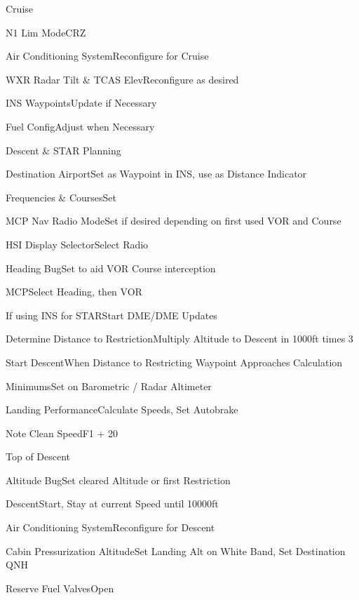 \documentclass[sim-use, blue_items]{checklist}
\begin{document}
\begin{checklist}{Cruise}
	 {
		\item{N1 Lim Mode}{CRZ}
		\item{Air Conditioning System}{Reconfigure for Cruise}
	\item{WXR Radar Tilt \& TCAS Elev}{Reconfigure as desired}
	}
	\item{INS Waypoints}{Update if Necessary}
	\item{Fuel Config}{Adjust when Necessary}
\end{checklist}

\begin{checklist}{Descent \& STAR Planning}
	\item{Destination Airport}{Set as Waypoint in INS, use as Distance Indicator}
	 {
		\item{Frequencies \& Courses}{Set}
		\item{MCP Nav Radio Mode}{Set if desired depending on first used VOR and Course}
		\item{HSI Display Selector}{Select Radio}
		\item{Heading Bug}{Set to aid VOR Course interception}
		\item{MCP}{Select Heading, then VOR}
	}
	\item{If using INS for STAR}{Start DME/DME Updates}
	 {
		\item{Determine Distance to Restriction}{Multiply Altitude to Descent in 1000ft times 3}
		\item{Start Descent}{When Distance to Restricting Waypoint Approaches Calculation}
	}
	\item{Minimums}{Set on Barometric / Radar Altimeter}
	\item{Landing Performance}{Calculate Speeds, Set Autobrake}
	\item{Note Clean Speed}{F1 + 20}
\end{checklist}

\begin{checklist}{Top of Descent}
	\item{Altitude Bug}{Set cleared Altitude or first Restriction}
	\item{Descent}{Start, Stay at current Speed until 10000ft}
	\item{Air Conditioning System}{Reconfigure for Descent}
	\item{Cabin Pressurization Altitude}{Set Landing Alt on White Band, Set Destination QNH}
	\item{Reserve Fuel Valves}{Open}
\end{checklist}
\end{document}
